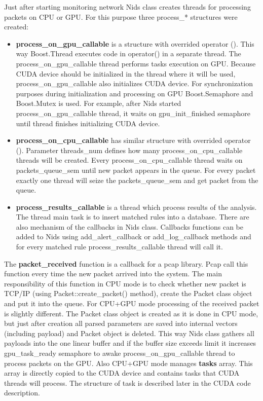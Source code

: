 \documentclass[thesis=M,english]{FITthesis}[2011/07/15]
\begin{document}
Just after starting monitoring network Nids class creates threads for processing packets on CPU or GPU. For this purpose three process\_* structures were created:
\begin{itemize}
\item \textbf{process\_on\_gpu\_callable} is a structure with overrided operator (). This way Boost.Thread executes code in operator() in a separate thread. The process\_on\_gpu\_callable thread performs tasks execution on GPU. Because CUDA device should be initialized in the thread where it will be used, process\_on\_gpu\_callable also initializes CUDA device. For synchronization purposes during initialization and processing on GPU Boost.Semaphore and Boost.Mutex is used. For example, after Nids started process\_on\_gpu\_callable thread, it waits on gpu\_init\_finished semaphore until thread finishes initializing CUDA device.
\item \textbf{process\_on\_cpu\_callable} has similar structure with overrided operator (). Parameter threads\_num defines how many process\_on\_cpu\_callable threads will be created. Every process\_on\_cpu\_callable thread waits on packets\_queue\_sem until new packet appears in the queue. For every packet exactly one thread will seize the packets\_queue\_sem and get packet from the queue.
\item \textbf{process\_results\_callable} is a thread which process results of the analysis. The thread main task is to insert matched rules into a database. There are also mechanism of the callbacks in Nids class. Callbacks functions can be added to Nids using add\_alert\_callback or add\_log\_callback methods and for every matched rule process\_results\_callable thread will call it.
\end{itemize}

The \textbf{packet\_received} function is a callback for a pcap library. Pcap call this function every time the new packet arrived into the system. The main responsibility of this function in CPU mode is to check whether new packet is TCP/IP (using Packet::create\_packet() method), create the Packet class object and put it into the queue. For CPU+GPU mode processing of the received packet is slightly different. The Packet class object is created as it is done in CPU mode, but just after creation all parsed parameters are saved into internal vectors (including payload) and Packet object is deleted. This way Nids class gathers all payloads into the one linear buffer and if the buffer size exceeds limit it increases gpu\_task\_ready semaphore to awake process\_on\_gpu\_callable thread to process packets on the GPU. Also CPU+GPU mode manages \textbf{tasks} array. This array is directly copied to the CUDA device and contains tasks that CUDA threads will process. The structure of task is described later in the CUDA code description.
\end{document}
